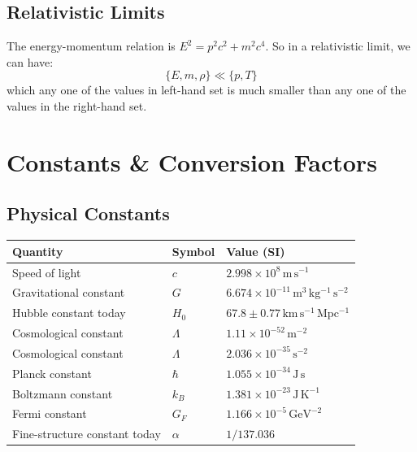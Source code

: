 \section{Relativistic Limits}
The energy-momentum relation is $E^2 = p^2c^2 + m^2c^4$.
So in a relativistic limit, we can have:
\[
      \{ E, m, \rho\} \ll \{p, T\}
\]
which any one of the values in left-hand set is much smaller than any one of the values in the right-hand set.
\clearpage





\chapter{Constants \& Conversion Factors}

\section{Physical Constants}

\begin{center}
\begin{tabular}{lll}
\toprule
\textbf{Quantity} & \textbf{Symbol} & \textbf{Value (SI)} \\
\midrule
Speed of light         & $c$       & $2.998 \times 10^8 \,\mathrm{m\,s^{-1}}$           \\
Gravitational constant & $G$       & $6.674 \times 10^{-11} \,\mathrm{m^3\,kg^{-1}\,s^{-2}}$ \\
Hubble constant today  & $H_0$     & $67.8 \pm 0.77 \,\mathrm{km\,s^{-1}\,Mpc^{-1}}$     \\
Cosmological constant   & $\Lambda$ & $1.11 \times 10^{-52} \,\mathrm{m^{-2}}$           \\
Cosmological constant &$\Lambda$ & $2.036 \times 10^{-35} \,\mathrm{s^{-2}}$           \\
Planck constant         & $\hbar$   & $1.055 \times 10^{-34} \,\mathrm{J\,s}$                     \\
Boltzmann constant      & $k_B$     & $1.381 \times 10^{-23} \,\mathrm{J\,K^{-1}}$                    \\
Fermi constant           & $G_F$     & $1.166 \times 10^{-5} \,\mathrm{GeV^{-2}}$                    \\
Fine-structure constant today  & $\alpha$  & $1/137.036$ \\
\bottomrule
\end{tabular}
\end{center}


